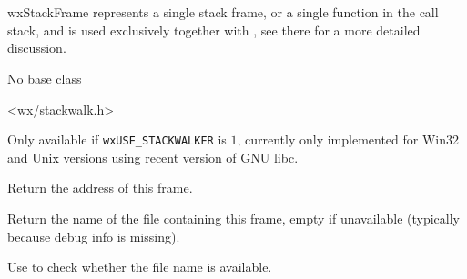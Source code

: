 
\section{}\label{wxstackframe}


wxStackFrame represents a single stack frame, or a single function in the call
stack, and is used exclusively together with 
, see there for a more detailed
discussion.



No base class


<wx/stackwalk.h>



Only available if \texttt{wxUSE\_STACKWALKER} is $1$, currently only
implemented for Win32 and Unix versions using recent version of GNU libc.






\label{wxstackframegetaddress}


Return the address of this frame.


\label{wxstackframegetfilename}


Return the name of the file containing this frame, empty if
unavailable (typically because debug info is missing).

Use  to check whether
the file name is available.


\label{wxstackframegetlevel}


